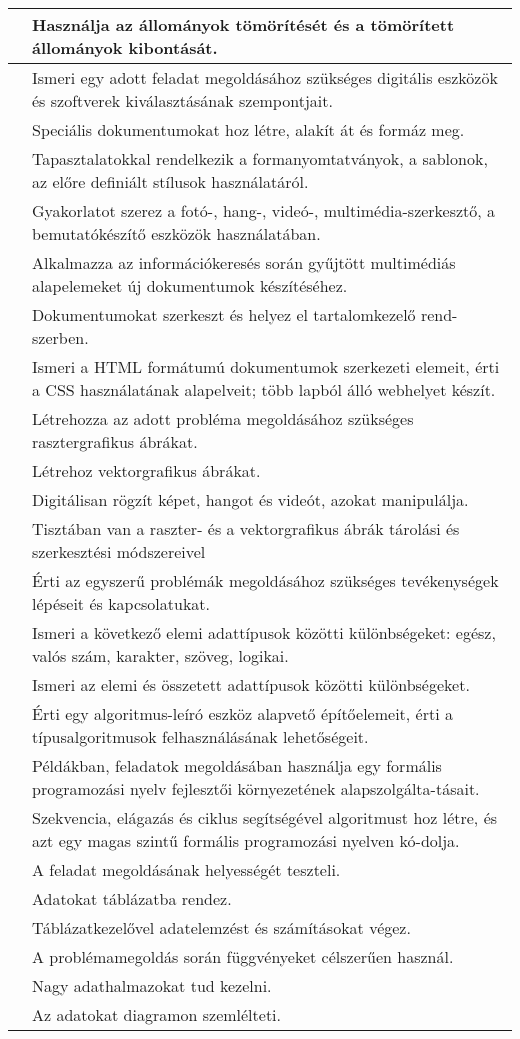 \begin{longtable}[]{p{\evflength}@{\strut}>{\begin{minipage}{\columnlength}\strut}l<{\strut\end{minipage}}}
\tabularnewline
\hline
&
  Használja az állományok tömörítését és a tömörített állományok
  kibontását.
\tabularnewline
\hline
&
  Ismeri egy adott feladat megoldásához szükséges digitális eszközök és
  szoftverek kiválasztásának szempontjait.
\tabularnewline
\hline
&
  Speciális dokumentumokat hoz létre, alakít át és formáz meg.
\tabularnewline
\hline
&
  Tapasztalatokkal rendelkezik a formanyomtatványok, a sablonok, az
  előre definiált stílusok használatáról.
\tabularnewline
\hline
&
  Gyakorlatot szerez a fotó-, hang-, videó-, multimédia-szer\-kesz\-tő, a
  bemutatókészítő eszközök használatában.
\tabularnewline
\hline
&
  Alkalmazza az információkeresés során gyűjtött multimédiás
  alapelemeket új dokumentumok készítéséhez.
\tabularnewline
\hline
&
  Dokumentumokat szerkeszt és helyez el tartalomkezelő rend-\break szerben.
\tabularnewline
\hline
&
  Ismeri a HTML formátumú dokumentumok szerkezeti elemeit, érti a CSS
  használatának alapelveit; több lapból álló webhelyet készít.
\tabularnewline
\hline
&
  Létrehozza az adott probléma megoldásához szükséges rasztergrafikus
  ábrákat.
\tabularnewline
\hline
&
  Létrehoz vektorgrafikus ábrákat.
\tabularnewline
\hline
&
  Digitálisan rögzít képet, hangot és videót, azokat manipulálja.
\tabularnewline
\hline
&
  Tisztában van a raszter- és a vektorgrafikus ábrák tárolási és
  szerkesztési módszereivel
\tabularnewline
\hline
&
  Érti az egyszerű problémák megoldásához szükséges tevékenységek
  lépéseit és kapcsolatukat.
\tabularnewline
\hline
&
  Ismeri a következő elemi adattípusok közötti különbségeket: egész,
  valós szám, karakter, szöveg, logikai.
\tabularnewline
\hline
&
  Ismeri az elemi és összetett adattípusok közötti különbségeket.
\tabularnewline
\hline
&
  Érti egy algoritmus-leíró eszköz alapvető építőelemeit, érti a
  típusalgoritmusok felhasználásának lehetőségeit.
\tabularnewline
\hline
&
  Példákban, feladatok megoldásában használja egy formális programozási
  nyelv fejlesztői környezetének alapszolgálta-\break tásait.
\tabularnewline
\hline
&
  Szekvencia, elágazás és ciklus segítségével algoritmust hoz létre, és
  azt egy magas szintű formális programozási nyelven kó-\break dolja.
\tabularnewline
\hline
&
  A feladat megoldásának helyességét teszteli.
\tabularnewline
\hline
&
  Adatokat táblázatba rendez.
\tabularnewline
\hline
&
  Táblázatkezelővel adatelemzést és számításokat végez.
\tabularnewline
\hline
&
  A problémamegoldás során függvényeket célszerűen használ.
\tabularnewline
\hline
&
  Nagy adathalmazokat tud kezelni.
\tabularnewline
\hline
&
  Az adatokat diagramon szemlélteti.

\end{longtable}
